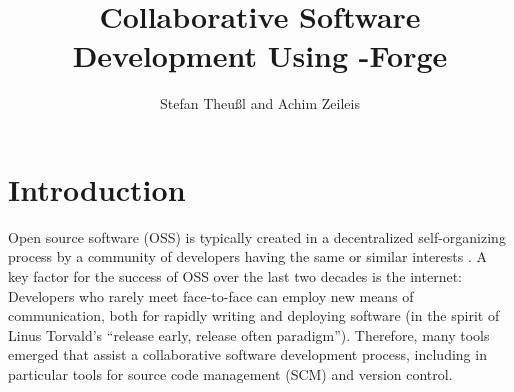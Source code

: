 \title{Collaborative Software Development Using \R{}-Forge}
\author{Stefan Theu\ss{}l and Achim Zeileis}

\maketitle



\newcommand{\tab}[1]{{\normalfont\textit{#1}}}

\section*{Introduction}

Open source software (OSS) is typically created in a decentralized
self-organizing process by a community of developers having the same
or similar interests \citep[see the famous essay by][]{forge:Raymond:1999}. 
A key factor for the success of OSS over the last two decades is the
internet: Developers who rarely meet face-to-face can employ new means
of communication, both for rapidly writing and deploying software
(in the spirit of Linus Torvald's ``release early, release often paradigm''). 
Therefore, many tools emerged that assist a collaborative software
development process, including in particular tools for source code
management (SCM) and version control.

